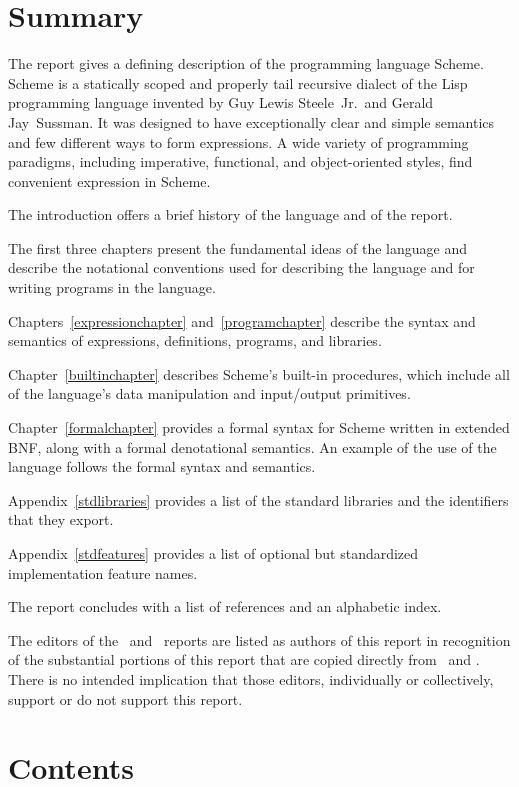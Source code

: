 \chapter*{Summary}

The report gives a defining description of the programming language
Scheme.  Scheme is a statically scoped and properly tail recursive
dialect of the Lisp programming language invented by Guy Lewis
Steele~Jr.\ and Gerald Jay~Sussman.  It was designed to have
exceptionally clear and simple semantics and few different ways to
form expressions.  A wide variety of programming paradigms, including
imperative, functional, and object-oriented styles, find convenient
expression in Scheme.

\vest The introduction offers a brief history of the language and of
the report.

\vest The first three chapters present the fundamental ideas of the
language and describe the notational conventions used for describing the
language and for writing programs in the language.

\vest Chapters~\ref{expressionchapter} and~\ref{programchapter} describe
the syntax and semantics of expressions, definitions, programs, and libraries.

\vest Chapter~\ref{builtinchapter} describes Scheme's built-in
procedures, which include all of the language's data manipulation and
input/output primitives.

\vest Chapter~\ref{formalchapter} provides a formal syntax for Scheme
written in extended BNF, along with a formal denotational semantics.
An example of the use of the language follows the formal syntax and
semantics.

\vest Appendix~\ref{stdlibraries} provides a list of the standard libraries
and the identifiers that they export.

\vest Appendix~\ref{stdfeatures} provides a list of optional but standardized
implementation feature names.


\vest The report concludes with a list of references and an
alphabetic index.

\begin{note}
The editors of the \rfivers\ and \rsixrs\ reports are
listed as authors of this report in recognition of the substantial
portions of this report that are copied directly from \rfivers\ and \rsixrs.
There is no intended implication that those editors, individually or
collectively, support or do not support this report.
\end{note}


\vfill
\eject

\chapter*{Contents}
\addvspace{3.5pt}                  %
\renewcommand{\tocshrink}{-3.5pt}  %
{\footnotesize
\tableofcontents
}

\vfill
\eject
